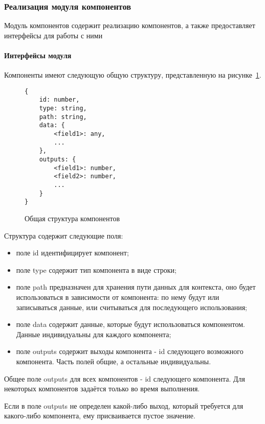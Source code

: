 
\subsubsection{Реализация модуля компонентов}


Модуль компонентов содержит реализацию компонентов, а также
предоставляет интерфейсы для работы с ними

\paragraph{Интерфейсы модуля}

Компоненты имеют следующую общую структуру, представленную на
рисунке~\ref{f:comp-struct}.


\begin{figure}[ht]
	\centering
	\vspace{\toppaddingoffigure}
	\begin{lstlisting}
{
    id: number,
    type: string,
    path: string,
    data: {
        <field1>: any,
        ...
    },
    outputs: {
        <field1>: number,
        <field2>: number,
        ...
    }
}

    \end{lstlisting}
	\caption{Общая структура компонентов}
	\label{f:comp-struct}
\end{figure}

Структура содержит следующие поля:
\begin{itemize}
	\item поле id идентифицирует компонент;
	\item поле type содержит тип компонента в виде строки;
	\item поле path предназначен для хранения пути данных для контекста,
	      оно будет использоваться в зависимости от компонента: по нему будут или
	      записываться данные, или считываться для последующего использования;
	\item поле data содержит данные, которые будут использоваться
	      компонентом. Данные индивидуальны для каждого компонента;
	\item поле outputs содержит выходы компонента - id следующего
	      возможного компонента. Часть полей общие, а остальные индивидуальны.

\end{itemize}
Общее поле outputs для всех компонентов - id следующего компонента.
Для некоторых компонентов задаётся только во время выполнения.

Если в поле outputs не определен какой-либо выход, который требуется
для какого-либо компонента, ему присваивается пустое значение.

